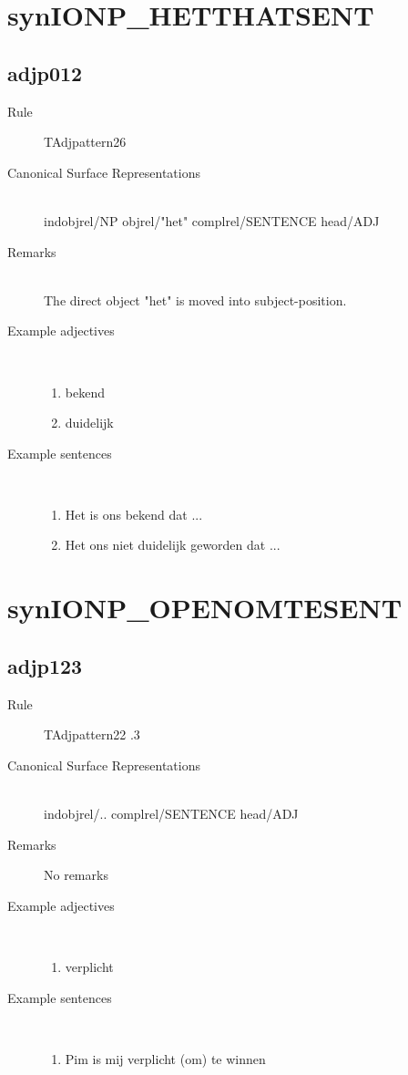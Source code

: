 \section{synIONP\_HETTHATSENT}
  \subsection{adjp012}
\begin{description}
  \item [Rule] TAdjpattern26
  \item [Canonical Surface Representations] \mbox{}\\
indobjrel/NP  objrel/"het" complrel/SENTENCE head/ADJ
  \item [Remarks] \mbox{}\\
The direct object "het" is moved into subject-position.
  \item [Example adjectives]\mbox{}\\
\begin{enumerate}
  \item bekend
  \item duidelijk
\end{enumerate}
  \item [Example sentences]\mbox{}\\
\begin{enumerate}
  \item Het is ons bekend dat ...
  \item Het ons niet duidelijk geworden dat ...
\end{enumerate}
\end{description}
\newpage
\section{synIONP\_OPENOMTESENT}
\subsection{adjp123}
\begin{description}
  \item [Rule] TAdjpattern22 .3
  \item [Canonical Surface Representations] \mbox{}\\  indobjrel/..  
complrel/SENTENCE head/ADJ
  \item [Remarks] No remarks

  \item [Example adjectives]\mbox{}\\
\begin{enumerate}
  \item verplicht
\end{enumerate}
  \item [Example sentences]\mbox{}\\
\begin{enumerate}
  \item Pim is mij verplicht (om) te winnen
\end{enumerate}
\end{description}
\newpage
